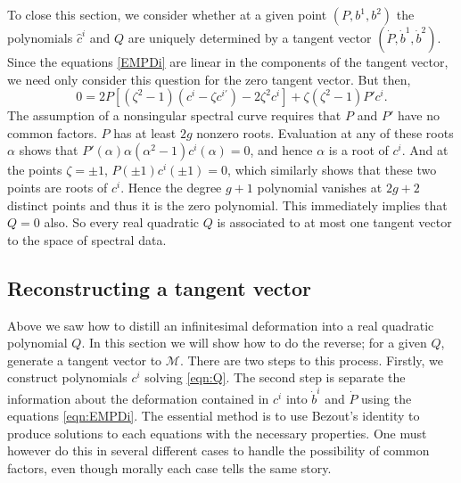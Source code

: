 To close this section, we consider whether at a given point $(P,b^1,b^2)$ the polynomials $\hat{c}^i$ and $Q$ are uniquely determined by a tangent vector $(\dot P, \dot b^1, \dot b^2)$. Since the equations \eqref{EMPDi} are linear in the components of the tangent vector, we need only consider this question for the zero tangent vector. But then,
\[
0 = 2P\left[ (ζ^2-1) (c^i - ζc^{i\prime}) - 2ζ^2c^i \right] + ζ(ζ^2-1)P'c^i.
\]
The assumption of a nonsingular spectral curve requires that $P$ and $P'$ have no common factors. $P$ has at least $2g$ nonzero roots. Evaluation at any of these roots $α$ shows that $P'(α)α(α^2-1)c^i(α) = 0$, and hence $α$ is a root of $c^i$. And at the points $ζ = \pm 1$, $P(\pm 1)c^i(\pm 1) = 0$, which similarly shows that these two points are roots of $c^i$. Hence the degree $g+1$ polynomial vanishes at $2g+2$ distinct points and thus it is the zero polynomial. This immediately implies that $Q=0$ also. So every real quadratic $Q$ is associated to at most one tangent vector to the space of spectral data.













\subsection{Reconstructing a tangent vector}
Above we saw how to distill an infinitesimal deformation into a real quadratic polynomial $Q$. In this section we will show how to do the reverse; for a given $Q$, generate a tangent vector to $\mathcal{M}$. There are two steps to this process. Firstly, we construct polynomials $c^i$ solving \eqref{eqn:Q}. The second step is separate the information about the deformation contained in $c^i$ into $\dot{b}^i$ and $\dot{P}$ using the equations \eqref{eqn:EMPDi}. The essential method is to use Bezout's identity to produce solutions to each equations with the necessary properties. One must however do this in several different cases to handle the possibility of common factors, even though morally each case tells the same story.

